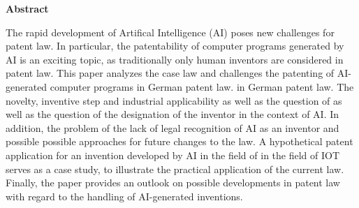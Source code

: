 \thispagestyle{empty}
\vspace*{1.0cm}

\begin{center}
    \textbf{Abstract}
\end{center}

\vspace*{0.5cm}

\noindent

The rapid development of Artifical Intelligence (AI)
poses new challenges for patent law. 
In particular, the patentability of computer programs generated by AI 
is an exciting topic, 
as traditionally only human inventors are considered in patent law. 
This paper analyzes the case law and challenges 
the patenting of AI-generated computer programs in German patent law. 
in German patent law. 
The novelty, inventive step and industrial applicability as well as the question of 
as well as the question of the designation of the inventor in the context of AI. 
In addition, the problem of the lack of legal recognition of AI as an inventor and possible 
possible approaches for future changes to the law. 
A hypothetical patent application for an invention developed by AI in the field of 
in the field of IOT serves as a case study, 
to illustrate the practical application of the current law. 
Finally, the paper provides an outlook 
on possible developments in patent law 
with regard to the handling of AI-generated inventions.
